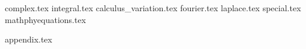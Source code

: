 \documentclass[
]{ctexbook}
\begin{document}


% 
% 

\setcounter{secnumdepth}{4}
\setcounter{tocdepth}{4}
\tableofcontents
% 


% 
% 

% 
% 
% 

{complex.tex}
{integral.tex}
{calculus_variation.tex}
{fourier.tex}
{laplace.tex}
{special.tex}
{mathphyequations.tex}



{appendix.tex}
\end{document}
